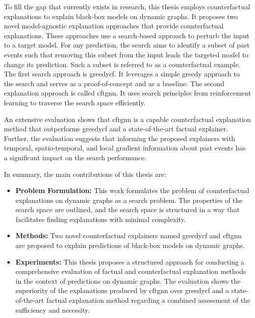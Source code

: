 To fill the gap that currently exists in research, this thesis employs counterfactual explanations to explain black-box models on dynamic graphs. It proposes two novel model-agnostic explanation approaches that provide counterfactual explanations. These approaches use a search-based approach to perturb the input to a target model. For any prediction, the search aims to identify a subset of past events such that removing this subset from the input leads the targeted model to change its prediction. Such a subset is referred to as a counterfactual example. The first search approach is \gls{greedycf}. It leverages a simple greedy approach to the search and serves as a proof-of-concept and as a baseline. The second explanation approach is called \gls{cftgnn}. It uses search principles from reinforcement learning to traverse the search space efficiently. 

An extensive evaluation shows that \gls{cftgnn} is a capable counterfactual explanation method that outperforms \gls{greedycf} and a state-of-the-art factual explainer. Further, the evaluation suggests that informing the proposed explainers with temporal, spatio-temporal, and local gradient information about past events has a significant impact on the search performance.

In summary, the main contributions of this thesis are:

\begin{itemize}
    \item \textbf{Problem Formulation:} This work formulates the problem of counterfactual explanations on dynamic graphs as a search problem. The properties of the search space are outlined, and the search space is structured in a way that facilitates finding explanations with minimal complexity.

    \item \textbf{Methods:} Two novel counterfactual explainers named \gls{greedycf} and \gls{cftgnn} are proposed to explain predictions of black-box models on dynamic graphs.

    \item \textbf{Experiments:} This thesis proposes a structured approach for conducting a comprehensive evaluation of factual and counterfactual explanation methods in the context of predictions on dynamic graphs. The evaluation shows the superiority of the explanations produced by \gls{cftgnn} over \gls{greedycf} and a state-of-the-art factual explanation method regarding a combined assessment of the sufficiency and necessity.
    
\end{itemize}


